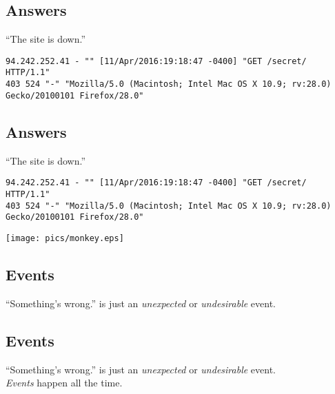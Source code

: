 \documentclass[xga]{xdvislides}
\begin{document}
\subsection{Answers}
``The site is down.'' \\

\begin{verbatim}
94.242.252.41 - "" [11/Apr/2016:19:18:47 -0400] "GET /secret/ HTTP/1.1"
403 524 "-" "Mozilla/5.0 (Macintosh; Intel Mac OS X 10.9; rv:28.0)
Gecko/20100101 Firefox/28.0"
\end{verbatim}

\subsection{Answers}
``The site is down.'' \\

\begin{verbatim}
94.242.252.41 - "" [11/Apr/2016:19:18:47 -0400] "GET /secret/ HTTP/1.1"
403 524 "-" "Mozilla/5.0 (Macintosh; Intel Mac OS X 10.9; rv:28.0)
Gecko/20100101 Firefox/28.0"
\end{verbatim}

\addvspace{.2in}
\begin{center}
	\texttt{[image: pics/monkey.eps]}
\end{center}

\subsection{Events}
\vspace*{\fill}
\Huge
\begin{center}
``Something's wrong.'' is just an {\em unexpected} or
{\em undesirable} event.
\end{center}
\Normalsize
\vspace*{\fill}

\subsection{Events}
\vspace*{\fill}
\Huge
\begin{center}
``Something's wrong.'' is just an {\em unexpected} or
{\em undesirable} event. \\
\vspace{.4in}
{\em Events} happen all the time.
\end{center}
\Normalsize
\vspace*{\fill}
\end{document}
